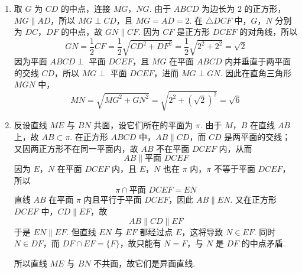 \begin{solution}
\begin{enumerate}
\item 取 \(G\) 为 \(CD\) 的中点，连接 \(MG\)，\(NG\). 由于 \(ABCD\) 为边长为 \(2\) 的正方形，\(MG\parallel AD\)，所以 \(MG\perp CD\)，且 \(MG=AD=2\). 在 \(\triangle DCF\) 中，\(G\)，\(N\) 分别为 \(DC\)，\(DF\) 的中点，故 \(GN\parallel CF\). 因为 \(CF\) 是正方形 \(DCEF\) 的对角线，所以
    \[
    GN=\frac12CF=\frac12\sqrt{CD^{2}+DF^{2}}
      =\frac12\sqrt{2^{2}+2^{2}}=\sqrt2
    \]
    因为平面 \(ABCD\perp\) 平面 \(DCEF\)，且 \(MG\) 在平面 \(ABCD\) 内并垂直于两平面的交线 \(CD\)，所以 \(MG\perp\) 平面 \(DCEF\)，进而 \(MG\perp GN\). 因此在直角三角形 \(MGN\) 中，
    \[
    MN=\sqrt{MG^{2}+GN^{2}}=\sqrt{2^{2}+\left(\sqrt2\right)^{2}}=\sqrt6
    \]
\item 反设直线 \(ME\) 与 \(BN\) 共面，设它们所在的平面为 \(\pi\). 由于 \(M\)，\(B\) 在直线 \(AB\) 上，故 \(AB\subset\pi\). 在正方形 \(ABCD\) 中，\(AB\parallel CD\)，而 \(CD\) 是两平面的交线；又因两正方形不在同一平面内，故 \(AB\) 不在平面 \(DCEF\) 内，从而
    \[
    AB\parallel\text{平面 }DCEF
    \]
    因为 \(E\)，\(N\) 在平面 \(DCEF\) 内，且 \(E\)，\(N\) 也在 \(\pi\) 内，\(\pi\) 不等于平面 \(DCEF\)，所以
    \[
    \pi\cap\text{平面 }DCEF=EN
    \]
    直线 \(AB\) 在平面 \(\pi\) 内且平行于平面 \(DCEF\)，因此 \(AB\parallel EN\). 又在正方形 \(DCEF\) 中，\(CD\parallel EF\)，故
    \[
    AB\parallel CD\parallel EF
    \]
    于是 \(EN\parallel EF\). 但直线 \(EN\) 与 \(EF\) 都经过点 \(E\)，这将导致 \(N\in EF\). 同时 \(N\in DF\)，而 \(DF\cap EF=\{F\}\)，故只能有 \(N=F\)，与 \(N\) 是 \(DF\) 的中点矛盾.

    所以直线 \(ME\) 与 \(BN\) 不共面，故它们是异面直线.
\end{enumerate}
\end{solution}

